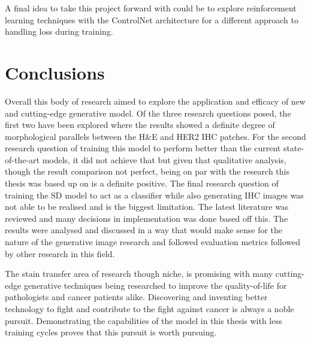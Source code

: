 A final idea to take this project forward with could be to explore reinforcement learning techniques with the ControlNet architecture for a different approach to handling loss during training.

\section{Conclusions}

Overall this body of research aimed to explore the application and efficacy of new and cutting-edge generative model. Of the three research questions posed, the first two have been explored where the results showed a definite degree of morphological parallels between the H\&E and HER2 IHC patches. For the second research question of training this model to perform better than the current state-of-the-art models, it did not achieve that but given that qualitative analysis, though the result comparison not perfect, being on par with the research this thesis was based up on is a definite positive. The final research question of training the SD model to act as a classifier while also generating IHC images was not able to be realised and is the biggest limitation. The latest literature was reviewed and many decisions in implementation was done based off this. The results were analysed and discussed in a way that would make sense for the nature of the generative image research and followed evaluation metrics followed by other research in this field.

The stain transfer area of research though niche, is promising with many cutting-edge generative techniques being researched to improve the quality-of-life for pathologists and cancer patients alike. Discovering and inventing better technology to fight and contribute to the fight against cancer is always a noble pursuit. Demonstrating the capabilities of the model in this thesis with less training cycles proves that this pursuit is worth pursuing. 


